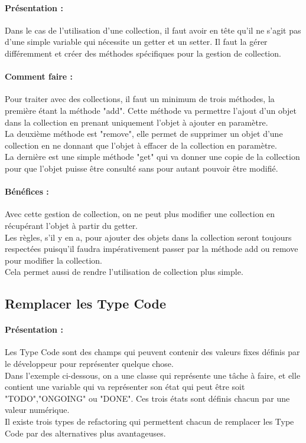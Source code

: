 \documentclass[a4paper,twoside,12pt,openright]{report}
\begin{document}
\paragraph{Présentation :}
Dans le cas de l'utilisation d'une collection, il faut avoir en tête qu'il ne s'agit pas d'une simple variable qui nécessite un getter et un setter. Il faut la gérer différemment et créer des méthodes spécifiques pour la gestion de collection.

\paragraph{Comment faire :}
Pour traiter avec des collections, il faut un minimum de trois méthodes, la première étant la méthode "add". Cette méthode va permettre l'ajout d'un objet dans la collection en prenant uniquement l'objet à ajouter en paramètre.\\
La deuxième méthode est "remove", elle permet de supprimer un objet d'une collection en ne donnant que l'objet à effacer de la collection en paramètre.\\
La dernière est une simple méthode "get" qui va donner une copie de la collection pour que l'objet puisse être consulté sans pour autant pouvoir être modifié.

\paragraph{Bénéfices :}
Avec cette gestion de collection, on ne peut plus modifier une collection en récupérant l'objet à partir du getter.\\
Les règles, s'il y en a, pour ajouter des objets dans la collection seront toujours respectées puisqu'il faudra impérativement passer par la méthode add ou remove pour modifier la collection.\\
Cela permet aussi de rendre l'utilisation de collection plus simple.\\

\subsection{Remplacer les Type Code}
\paragraph{Présentation :}
Les Type Code sont des champs qui peuvent contenir des valeurs fixes définis par le développeur pour représenter quelque chose.\\
Dans l'exemple ci-dessous, on a une classe qui représente une tâche à faire, et elle contient une variable qui va représenter son état qui peut être soit "TODO","ONGOING" ou "DONE". Ces trois états sont définis chacun par une valeur numérique.\\
Il existe trois types de refactoring qui permettent chacun de remplacer les Type Code par des alternatives plus avantageuses.
\end{document}
